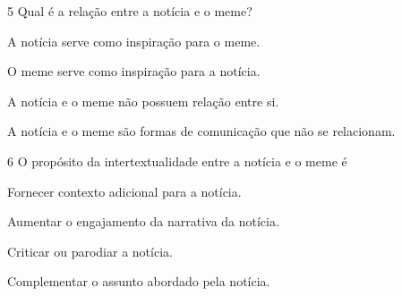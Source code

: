 \num{5} Qual é a relação entre a notícia e o meme?

\begin{escolha}
\item
  A notícia serve como inspiração para o meme.
\item
  O meme serve como inspiração para a notícia.
\item
  A notícia e o meme não possuem relação entre si.
\item
  A notícia e o meme são formas de comunicação que não se relacionam.
\end{escolha}






\num{6} O propósito da intertextualidade entre a notícia e o meme é

\begin{escolha}
\item
  Fornecer contexto adicional para a notícia.
\item
  Aumentar o engajamento da narrativa da notícia.
\item
  Criticar ou parodiar a notícia.
\item
  Complementar o assunto abordado pela notícia.
\end{escolha}




